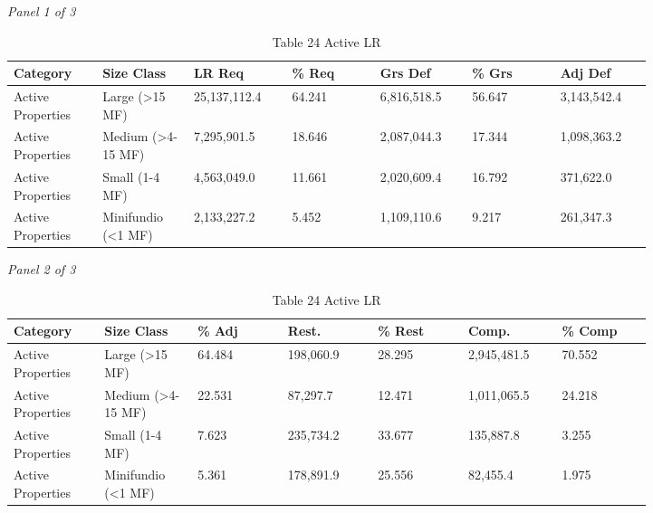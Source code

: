 \documentclass[12pt]{article}
\begin{document}
\begin{landscape}
\begin{table}[H]
\centering
\caption{Table 24 Active LR}
\textit{Panel 1 of 3}\\[2pt]
{\fontsize{12}{14}\selectfont
\setlength{\tabcolsep}{3pt}
\renewcommand{\arraystretch}{1.08}
\begin{tabular}{p{0.117\linewidth}p{0.117\linewidth}p{0.117\linewidth}p{0.117\linewidth}p{0.117\linewidth}p{0.117\linewidth}p{0.117\linewidth}}
\toprule
Category & Size Class & LR Req & \% Req & Grs Def & \% Grs & Adj Def \\
\midrule
Active Properties & Large (>15 MF) & 25,137,112.4 & 64.241 & 6,816,518.5 & 56.647 & 3,143,542.4 \\
Active Properties & Medium (>4-15 MF) & 7,295,901.5 & 18.646 & 2,087,044.3 & 17.344 & 1,098,363.2 \\
Active Properties & Small (1-4 MF) & 4,563,049.0 & 11.661 & 2,020,609.4 & 16.792 & 371,622.0 \\
Active Properties & Minifundio (<1 MF) & 2,133,227.2 & 5.452 & 1,109,110.6 & 9.217 & 261,347.3 \\
\bottomrule
\end{tabular}
}

\vspace{0.6em}

\textit{Panel 2 of 3}\\[2pt]
{\fontsize{12}{14}\selectfont
\setlength{\tabcolsep}{3pt}
\renewcommand{\arraystretch}{1.08}
\begin{tabular}{p{0.117\linewidth}p{0.117\linewidth}p{0.117\linewidth}p{0.117\linewidth}p{0.117\linewidth}p{0.117\linewidth}p{0.117\linewidth}}
\toprule
Category & Size Class & \% Adj & Rest. & \% Rest & Comp. & \% Comp \\
\midrule
Active Properties & Large (>15 MF) & 64.484 & 198,060.9 & 28.295 & 2,945,481.5 & 70.552 \\
Active Properties & Medium (>4-15 MF) & 22.531 & 87,297.7 & 12.471 & 1,011,065.5 & 24.218 \\
Active Properties & Small (1-4 MF) & 7.623 & 235,734.2 & 33.677 & 135,887.8 & 3.255 \\
Active Properties & Minifundio (<1 MF) & 5.361 & 178,891.9 & 25.556 & 82,455.4 & 1.975 \\
\bottomrule
\end{tabular}
}

\vspace{0.6em}


\end{table}
\end{landscape}
\end{document}
